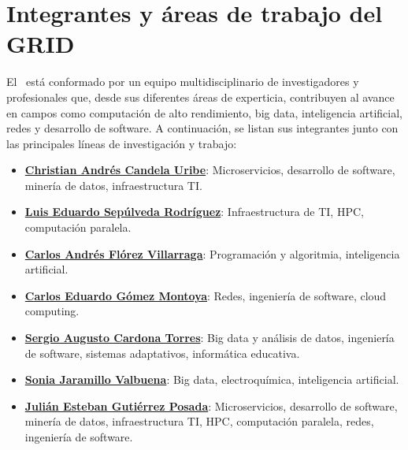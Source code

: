 

\section{Integrantes y áreas de trabajo del GRID}

El \GRID\ está conformado por un equipo multidisciplinario de investigadores y profesionales que, desde sus diferentes áreas de experticia, contribuyen al avance en campos como computación de alto rendimiento, big data, inteligencia artificial, redes y desarrollo de software. A continuación, se listan sus integrantes junto con las principales líneas de investigación y trabajo:  

\begin{itemize}
  \item \href{https://scienti.minciencias.gov.co/cvlac/visualizador/generarCurriculoCv.do?cod_rh=0000210897}{\textbf{Christian Andrés Candela Uribe}}: Microservicios, desarrollo de software, minería de datos, infraestructura TI.\@
  \item \href{https://scienti.minciencias.gov.co/cvlac/visualizador/generarCurriculoCv.do?cod_rh=0001383939}{\textbf{Luis Eduardo Sepúlveda Rodríguez}}: Infraestructura de TI, HPC, computación paralela.
  \item \href{https://scienti.minciencias.gov.co/cvlac/visualizador/generarCurriculoCv.do?cod_rh=0001638854}{\textbf{Carlos Andrés Flórez Villarraga}}: Programación y algoritmia, inteligencia artificial.
  \item \href{https://scienti.minciencias.gov.co/cvlac/visualizador/generarCurriculoCv.do?cod_rh=0001343801}{\textbf{Carlos Eduardo Gómez Montoya}}: Redes, ingeniería de software, cloud computing.
  \item \href{https://scienti.minciencias.gov.co/cvlac/visualizador/generarCurriculoCv.do?cod_rh=0001398775}{\textbf{Sergio Augusto Cardona Torres}}: Big data y análisis de datos, ingeniería de software, sistemas adaptativos, informática educativa.
  \item \href{https://scienti.minciencias.gov.co/cvlac/visualizador/generarCurriculoCv.do?cod_rh=0000193550}{\textbf{Sonia Jaramillo Valbuena}}: Big data, electroquímica, inteligencia artificial.
  \item \href{https://scienti.minciencias.gov.co/cvlac/visualizador/generarCurriculoCv.do?cod_rh=0000283495}{\textbf{Julián Esteban Gutiérrez Posada}}: Microservicios, desarrollo de software, minería de datos, infraestructura TI, HPC, computación paralela, redes, ingeniería de software.
\end{itemize}

